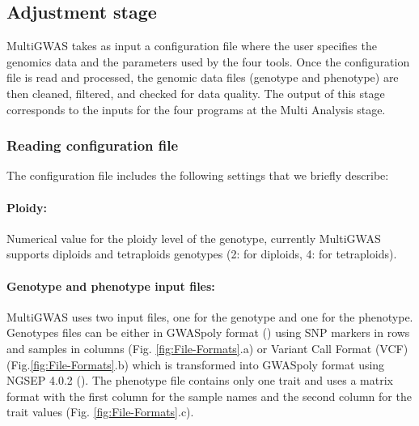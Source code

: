 \documentclass{article}
\begin{document}
\subsection{Adjustment stage}

MultiGWAS takes as input a configuration file where the user specifies the genomics data and the parameters used by the four tools. Once the configuration file is read and processed, the genomic data files (genotype and phenotype) are then cleaned, filtered, and checked for data quality. The output of this stage corresponds to the inputs for the four programs at the Multi Analysis stage.


\subsubsection{Reading configuration file\label{section-Reading-configuration-file}}

The configuration file includes the following settings that we briefly describe:%

\paragraph{{Ploidy:}} Numerical value for the ploidy level of the genotype, currently MultiGWAS supports diploids and tetraploids genotypes (2: for diploids, 4: for tetraploids).

\paragraph{{Genotype and phenotype input files:}}

MultiGWAS uses two input files, one for the genotype and one for the phenotype. Genotypes files can be either in GWASpoly format (\cite{Rosyara2016}) using SNP markers in rows and samples in columns (Fig. \ref{fig:File-Formats}.a) or Variant Call Format (VCF) (Fig.\ref{fig:File-Formats}.b) which is transformed into GWASpoly format using NGSEP 4.0.2 (\cite{Duitama2019}). The phenotype file contains only one trait and uses a matrix format with the first column for the sample names and the second column for the trait values (Fig. \ref{fig:File-Formats}.c).
\end{document}
